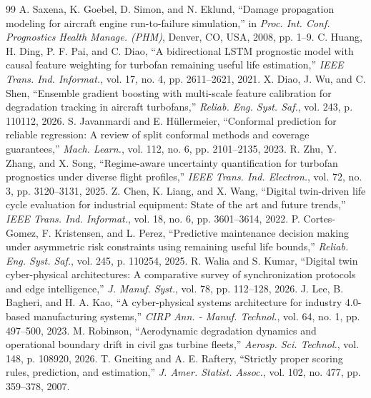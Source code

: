 \documentclass[12pt,a4paper]{article}
\begin{document}
\begin{thebibliography}{99}
\small
{} A. Saxena, K. Goebel, D. Simon, and N. Eklund, ``Damage propagation modeling for aircraft engine run-to-failure simulation,'' in \textit{Proc. Int. Conf. Prognostics Health Manage. (PHM)}, Denver, CO, USA, 2008, pp. 1--9.
 C. Huang, H. Ding, P. F. Pai, and C. Diao, ``A bidirectional LSTM prognostic model with causal feature weighting for turbofan remaining useful life estimation,'' \textit{IEEE Trans. Ind. Informat.}, vol. 17, no. 4, pp. 2611--2621, 2021.
 X. Diao, J. Wu, and C. Shen, ``Ensemble gradient boosting with multi-scale feature calibration for degradation tracking in aircraft turbofans,'' \textit{Reliab. Eng. Syst. Saf.}, vol. 243, p. 110112, 2026.
 S. Javanmardi and E. H\"ullermeier, ``Conformal prediction for reliable regression: A review of split conformal methods and coverage guarantees,'' \textit{Mach. Learn.}, vol. 112, no. 6, pp. 2101--2135, 2023.
 R. Zhu, Y. Zhang, and X. Song, ``Regime-aware uncertainty quantification for turbofan prognostics under diverse flight profiles,'' \textit{IEEE Trans. Ind. Electron.}, vol. 72, no. 3, pp. 3120--3131, 2025.
 Z. Chen, K. Liang, and X. Wang, ``Digital twin-driven life cycle evaluation for industrial equipment: State of the art and future trends,'' \textit{IEEE Trans. Ind. Informat.}, vol. 18, no. 6, pp. 3601--3614, 2022.
 P. Cortes-Gomez, F. Kristensen, and L. Perez, ``Predictive maintenance decision making under asymmetric risk constraints using remaining useful life bounds,'' \textit{Reliab. Eng. Syst. Saf.}, vol. 245, p. 110254, 2025.
 R. Walia and S. Kumar, ``Digital twin cyber-physical architectures: A comparative survey of synchronization protocols and edge intelligence,'' \textit{J. Manuf. Syst.}, vol. 78, pp. 112--128, 2026.
 J. Lee, B. Bagheri, and H. A. Kao, ``A cyber-physical systems architecture for industry 4.0-based manufacturing systems,'' \textit{CIRP Ann. - Manuf. Technol.}, vol. 64, no. 1, pp. 497--500, 2023.
 M. Robinson, ``Aerodynamic degradation dynamics and operational boundary drift in civil gas turbine fleets,'' \textit{Aerosp. Sci. Technol.}, vol. 148, p. 108920, 2026.
 T. Gneiting and A. E. Raftery, ``Strictly proper scoring rules, prediction, and estimation,'' \textit{J. Amer. Statist. Assoc.}, vol. 102, no. 477, pp. 359--378, 2007.

\end{thebibliography}
\end{document}
